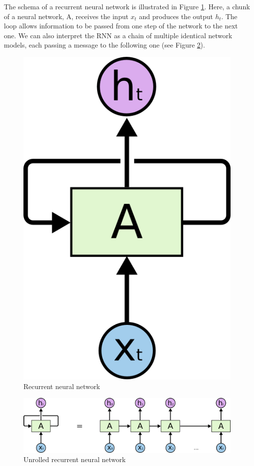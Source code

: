 The schema of a recurrent neural network is illustrated in Figure \ref{fig:RNN}. Here, a chunk of a neural network, A, receives the input $x_t$ and produces the output $h_t$. The loop allows information to be passed from one step of the network to the next one. We can also interpret the RNN as a chain of multiple identical network models, each passing a message to the following one (see Figure \ref{fig:RNN_unrolled}).
\begin{figure}[h!]
    \centering
    \includegraphics[scale=0.3]{figures/RNN-rolled.png}
    \caption{Recurrent neural network \cite{LSTM_blog}}
    \label{fig:RNN}
\end{figure}

\begin{figure}[h!]
    \centering
    \includegraphics[scale=0.3]{figures/RNN-unrolled.png}
    \caption{Unrolled recurrent neural network \cite{LSTM_blog}}
    \label{fig:RNN_unrolled}
\end{figure}


